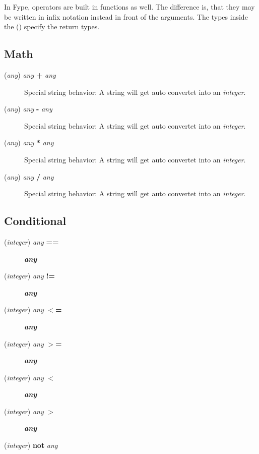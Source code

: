 In Fype, operators are built in functions as well. The difference is, that they may be written in infix notation instead in front of the arguments. The types inside the () specify the return types.

\subsection*{Math\label{Math}}
\begin{description}

\item[{(\textit{any}) \textit{any} \textbf{+} \textit{any}}] \mbox{}

Special string behavior: A string will get auto convertet into an \textit{integer}.


\item[{(\textit{any}) \textit{any} \textbf{-} \textit{any}}] \mbox{}

Special string behavior: A string will get auto convertet into an \textit{integer}.


\item[{(\textit{any}) \textit{any} \textbf{*} \textit{any}}] \mbox{}

Special string behavior: A string will get auto convertet into an \textit{integer}.


\item[{(\textit{any}) \textit{any} \textbf{/} \textit{any}}] \mbox{}

Special string behavior: A string will get auto convertet into an \textit{integer}.

\end{description}
\subsection*{Conditional\label{Conditional}}
\begin{description}

\item[{(\textit{integer}) \textit{any} \textbf{==}}] \textbf{\textit{any}}
\item[{(\textit{integer}) \textit{any} \textbf{!=}}] \textbf{\textit{any}}
\item[{(\textit{integer}) \textit{any} \textbf{$<$=}}] \textbf{\textit{any}}
\item[{(\textit{integer}) \textit{any} \textbf{$>$=}}] \textbf{\textit{any}}
\item[{(\textit{integer}) \textit{any} \textbf{$<$}}] \textbf{\textit{any}}
\item[{(\textit{integer}) \textit{any} \textbf{$>$}}] \textbf{\textit{any}}
\item[{(\textit{integer}) \textbf{not} \textit{any}}] \mbox{}\end{description}
